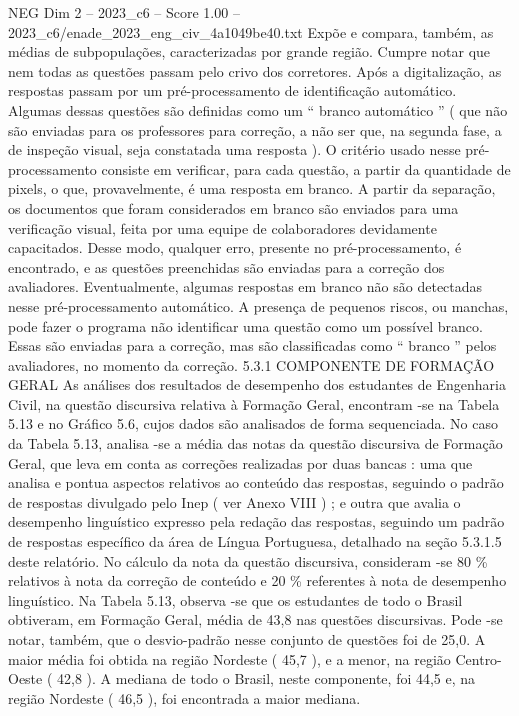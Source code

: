 \begin{textsample}{NEG Dim 2 – 2023\_c6 – Score 1.00 – 2023\_c6/enade\_2023\_eng\_civ\_4a1049be40.txt}
Expõe e compara, também, as médias de subpopulações, caracterizadas por grande região.
Cumpre notar que nem todas as questões passam pelo crivo dos corretores.
Após a digitalização, as respostas passam por um pré-processamento de identificação automático.
Algumas dessas questões são definidas como um “ branco automático ” ( que não são enviadas para os professores para correção, a não ser que, na segunda fase, a de inspeção visual, seja constatada uma resposta ).
O critério usado nesse pré-processamento consiste em verificar, para cada questão, a partir da quantidade de pixels, o que, provavelmente, é uma resposta em branco.
A partir da separação, os documentos que foram considerados em branco são enviados para uma verificação visual, feita por uma equipe de colaboradores devidamente capacitados.
Desse modo, qualquer erro, presente no pré-processamento, é encontrado, e as questões preenchidas são enviadas para a correção dos avaliadores.
Eventualmente, algumas respostas em branco não são detectadas nesse pré-processamento automático.
A presença de pequenos riscos, ou manchas, pode fazer o programa não identificar uma questão como um possível branco.
Essas são enviadas para a correção, mas são classificadas como “ branco ” pelos avaliadores, no momento da correção. 5.3.1 COMPONENTE DE FORMAÇÃO GERAL As análises dos resultados de desempenho dos estudantes de Engenharia Civil, na questão discursiva relativa à Formação Geral, encontram -se na Tabela 5.13 e no Gráfico 5.6, cujos dados são analisados de forma sequenciada.
No caso da Tabela 5.13, analisa -se a média das notas da questão discursiva de Formação Geral, que leva em conta as correções realizadas por duas bancas : uma que analisa e pontua aspectos relativos ao conteúdo das respostas, seguindo o padrão de respostas divulgado pelo Inep ( ver Anexo VIII ) ; e outra que avalia o desempenho linguístico expresso pela redação das respostas, seguindo um padrão de respostas específico da área de Língua Portuguesa, detalhado na seção 5.3.1.5 deste relatório.
No cálculo da nota da questão discursiva, consideram -se 80 \% relativos à nota da correção de conteúdo e 20 \% referentes à nota de desempenho linguístico.
Na Tabela 5.13, observa -se que os estudantes de todo o Brasil obtiveram, em Formação Geral, média de 43,8 nas questões discursivas.
Pode -se notar, também, que o desvio-padrão nesse conjunto de questões foi de 25,0.
A maior média foi obtida na região Nordeste ( 45,7 ), e a menor, na região Centro-Oeste ( 42,8 ).
A mediana de todo o Brasil, neste componente, foi 44,5 e, na região Nordeste ( 46,5 ), foi encontrada a maior mediana.

\end{textsample}
